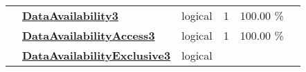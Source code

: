 \documentclass[]{article}
\begin{document}
\begin{longtable}[]{@{}lllrcl@{}}
\begin{minipage}[t]{0.07\columnwidth}
\end{minipage} & \begin{minipage}[t]{0.35\columnwidth}\raggedright\strut
\textbf{\protect\hyperlink{dataavailability3}{DataAvailability3}}\strut
\end{minipage} & \begin{minipage}[t]{0.11\columnwidth}\raggedright\strut
logical\strut
\end{minipage} & \begin{minipage}[t]{0.10\columnwidth}\raggedleft\strut
1\strut
\end{minipage} & \begin{minipage}[t]{0.10\columnwidth}\centering\strut
100.00 \%\strut
\end{minipage} & \begin{minipage}[t]{0.12\columnwidth}\raggedright\strut
\strut
\end{minipage}\tabularnewline
\begin{minipage}[t]{0.07\columnwidth}\raggedright\strut
\strut
\end{minipage} & \begin{minipage}[t]{0.35\columnwidth}\raggedright\strut
\textbf{\protect\hyperlink{dataavailabilityaccess3}{DataAvailabilityAccess3}}\strut
\end{minipage} & \begin{minipage}[t]{0.11\columnwidth}\raggedright\strut
logical\strut
\end{minipage} & \begin{minipage}[t]{0.10\columnwidth}\raggedleft\strut
1\strut
\end{minipage} & \begin{minipage}[t]{0.10\columnwidth}\centering\strut
100.00 \%\strut
\end{minipage} & \begin{minipage}[t]{0.12\columnwidth}\raggedright\strut
\strut
\end{minipage}\tabularnewline
\begin{minipage}[t]{0.07\columnwidth}\raggedright\strut
\strut
\end{minipage} & \begin{minipage}[t]{0.35\columnwidth}\raggedright\strut
\textbf{\protect\hyperlink{dataavailabilityexclusive3}{DataAvailabilityExclusive3}}\strut
\end{minipage} & \begin{minipage}[t]{0.11\columnwidth}\raggedright\strut
logical\strut
\end{minipage} & \begin{minipage}[t]{0.10\columnwidth}\raggedleft\strut

\end{minipage}
\end{longtable}
\end{document}
